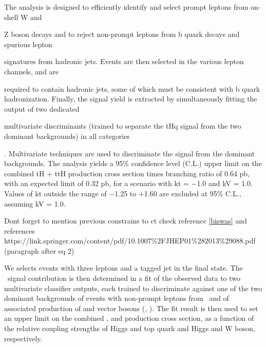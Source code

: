 The analysis is designed to efficiently identify and select prompt leptons from on-shell W and

Z boson decays and to reject non-prompt leptons from b quark decays and spurious lepton

signatures from hadronic jets. Events are then selected in the various lepton channels, and are

required to contain hadronic jets, some of which must be consistent with b quark hadronization. Finally, the signal yield is extracted by simultaneously fitting the output of two dedicated

multivariate discriminants (trained to separate the tHq signal from the two dominant backgrounds) in all categories








. Multivariate techniques are used to discriminate the signal from the dominant backgrounds. The analysis yields a 95\% confidence level (C.L.) upper limit on the combined tH + ttH production cross section times branching ratio of 0.64 pb, with an expected limit of 0.32 pb, for a scenario with kt = −1.0 and kV = 1.0. Values of kt outside the range of −1.25 to +1.60 are excluded at 95\% C.L., assuming kV = 1.0.

Dont forget to mention previous constrains to ct check reference \ref{biswas} and references https://link.springer.com/content/pdf/10.1007\%2FJHEP01\%282013\%29088.pdf (paragraph after eq 2)


\noindent We selects events with three leptons and a \bjet tagged jet in the final state. The \tHq \ signal contribution is then determined in a fit of the observed data to two multivariate classifier outputs, each trained to discriminate against one of the two dominant backgrounds of events with non-prompt leptons from \ttbar\ and of associated production of \ttbar and vector bosons (\ttW, \ttZ). The fit result is then used to set an upper limit on the combined \ttH, \tHq and \tHW production cross section, as a function of the relative coupling strengths of Higgs and top quark and Higgs and W boson, respectively.

























